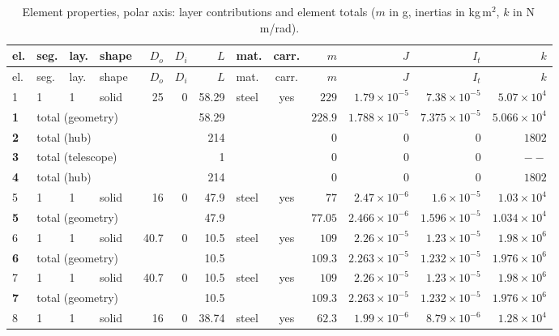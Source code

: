 \documentclass[10pt,a4paper]{article}
\numberwithin{equation}{section}
\begin{document}
\begin{longtable}{llllrrrlcrrrr}
\caption{Element properties, polar axis: layer contributions and element totals ($m$ in g, inertias in kg\,m$^2$, $k$ in N\,m/rad).}\\
\toprule
el. & seg. & lay. & shape & $D_o$ & $D_i$ & $L$ & mat. & carr. & $m$ & $J$ & $I_t$ & $k$ \\
\midrule\endfirsthead
\toprule el. & seg. & lay. & shape & $D_o$ & $D_i$ & $L$ & mat. & carr. & $m$ & $J$ & $I_t$ & $k$ \\ \midrule\endhead
1 & 1 & 1 & solid & 25 & 0 & 58.29 & steel & yes & $229$ & $1.79\times10^{-5}$ & $7.38\times10^{-5}$ & $5.07\times10^{4}$ \\
\midrule \textbf{1} & \multicolumn{5}{l}{total (geometry)} & 58.29 & & & $228.9$ & $1.788\times10^{-5}$ & $7.375\times10^{-5}$ & $5.066\times10^{4}$ \\ \midrule
\midrule \textbf{2} & \multicolumn{5}{l}{total (hub)} & 214 & & & $0$ & $0$ & $0$ & $1802$ \\ \midrule
\midrule \textbf{3} & \multicolumn{5}{l}{total (telescope)} & 1 & & & $0$ & $0$ & $0$ & $--$ \\ \midrule
\midrule \textbf{4} & \multicolumn{5}{l}{total (hub)} & 214 & & & $0$ & $0$ & $0$ & $1802$ \\ \midrule
5 & 1 & 1 & solid & 16 & 0 & 47.9 & steel & yes & $77$ & $2.47\times10^{-6}$ & $1.6\times10^{-5}$ & $1.03\times10^{4}$ \\
\midrule \textbf{5} & \multicolumn{5}{l}{total (geometry)} & 47.9 & & & $77.05$ & $2.466\times10^{-6}$ & $1.596\times10^{-5}$ & $1.034\times10^{4}$ \\ \midrule
6 & 1 & 1 & solid & 40.7 & 0 & 10.5 & steel & yes & $109$ & $2.26\times10^{-5}$ & $1.23\times10^{-5}$ & $1.98\times10^{6}$ \\
\midrule \textbf{6} & \multicolumn{5}{l}{total (geometry)} & 10.5 & & & $109.3$ & $2.263\times10^{-5}$ & $1.232\times10^{-5}$ & $1.976\times10^{6}$ \\ \midrule
7 & 1 & 1 & solid & 40.7 & 0 & 10.5 & steel & yes & $109$ & $2.26\times10^{-5}$ & $1.23\times10^{-5}$ & $1.98\times10^{6}$ \\
\midrule \textbf{7} & \multicolumn{5}{l}{total (geometry)} & 10.5 & & & $109.3$ & $2.263\times10^{-5}$ & $1.232\times10^{-5}$ & $1.976\times10^{6}$ \\ \midrule
8 & 1 & 1 & solid & 16 & 0 & 38.74 & steel & yes & $62.3$ & $1.99\times10^{-6}$ & $8.79\times10^{-6}$ & $1.28\times10^{4}$ \\

\end{longtable}
\end{document}
